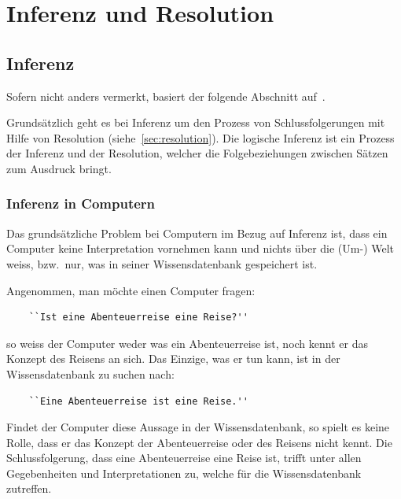 \chapter{Inferenz und Resolution}
\label{chap:inferenz_resolution}

\section{Inferenz}
\label{sec:inferenz}
Sofern nicht anders vermerkt, basiert der folgende Abschnitt auf~\cite[S. 163 - 165]{russel}.

Grundsätzlich geht es bei Inferenz um den Prozess von Schlussfolgerungen mit Hilfe von Resolution (siehe~\ref{sec:resolution}). Die logische Inferenz ist ein Prozess der Inferenz und der Resolution, welcher die Folgebeziehungen zwischen Sätzen zum Ausdruck bringt.

\subsection{Inferenz in Computern}
\label{subsec:inferenz-in-computer}

Das grundsätzliche Problem bei Computern im Bezug auf Inferenz ist, dass ein Computer keine Interpretation vornehmen kann und nichts über die (Um-) Welt weiss, bzw.\ nur, was in seiner Wissensdatenbank gespeichert ist.


Angenommen, man möchte einen Computer fragen:

\begin{lstlisting}
    ``Ist eine Abenteuerreise eine Reise?''
\end{lstlisting}

so weiss der Computer weder was ein Abenteuerreise ist, noch kennt er das Konzept des Reisens an sich. Das Einzige, was er tun kann, ist in der Wissensdatenbank zu suchen nach:

\begin{lstlisting}
    ``Eine Abenteuerreise ist eine Reise.''
\end{lstlisting}

Findet der Computer diese Aussage in der Wissensdatenbank, so spielt es keine Rolle, dass er das Konzept der Abenteuerreise oder des Reisens nicht kennt. Die Schlussfolgerung, dass eine Abenteuerreise eine Reise ist, trifft unter allen Gegebenheiten und Interpretationen zu, welche für die Wissensdatenbank zutreffen.

